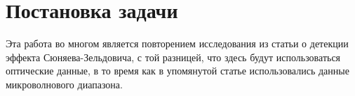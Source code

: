 \chapter{Постановка задачи}
\label{cha:ch_1}
Эта работа во многом является повторением исследования из статьи о детекции эффекта 
Сюняева-Зельдовича, с той разницей, что здесь будут использоваться оптические данные, в то время 
как в упомянутой статье использовались данные микроволнового диапазона.\\


